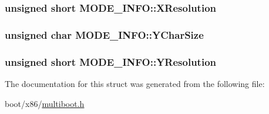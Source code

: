 \subsubsection[{X\+Resolution}]{\setlength{\rightskip}{0pt plus 5cm}unsigned short M\+O\+D\+E\+\_\+\+I\+N\+F\+O\+::\+X\+Resolution}\label{struct_m_o_d_e___i_n_f_o_abb1600e71614364d0a752798da65a1d6}
\hypertarget{struct_m_o_d_e___i_n_f_o_a818ddf6ff3ca5e5b45f76478f5813ac2}{}
\subsubsection[{Y\+Char\+Size}]{\setlength{\rightskip}{0pt plus 5cm}unsigned char M\+O\+D\+E\+\_\+\+I\+N\+F\+O\+::\+Y\+Char\+Size}\label{struct_m_o_d_e___i_n_f_o_a818ddf6ff3ca5e5b45f76478f5813ac2}
\hypertarget{struct_m_o_d_e___i_n_f_o_aaa07c2ee372621e82b06376c83e718e0}{}
\subsubsection[{Y\+Resolution}]{\setlength{\rightskip}{0pt plus 5cm}unsigned short M\+O\+D\+E\+\_\+\+I\+N\+F\+O\+::\+Y\+Resolution}\label{struct_m_o_d_e___i_n_f_o_aaa07c2ee372621e82b06376c83e718e0}


The documentation for this struct was generated from the following file\+:\begin{DoxyCompactItemize}
\item 
boot/x86/\hyperlink{multiboot_8h}{multiboot.\+h}\end{DoxyCompactItemize}
